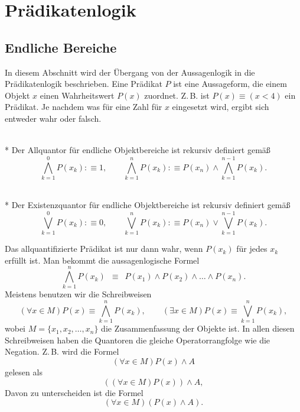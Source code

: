 \newpage
\section{Prädikatenlogik}
\subsection{Endliche Bereiche}
In diesem Abschnitt wird der Übergang von der Aussagenlogik in
die Prädikatenlogik beschrieben. Eine Prädikat $P$ ist eine Aussageform,
die einem Objekt $x$ einen Wahrheitswert $P(x)$ zuordnet. Z.\,B.
ist $P(x)\equiv (x<4)$ ein Prädikat. Je nachdem was für eine Zahl
für $x$ eingesetzt wird, ergibt sich entweder wahr oder falsch.

\begin{Definition}[Allquantor]\mbox{}\\*
Der Allquantor für endliche Objektbereiche
ist rekursiv definiert gemäß%
\[\bigwedge_{k=1}^0 P(x_k) :\equiv 1,\qquad
\bigwedge_{k=1}^n P(x_k) :\equiv P(x_n)\land\bigwedge_{k=1}^{n-1} P(x_k).\]
\end{Definition}

\begin{Definition}[Existenzquantor]\mbox{}\\*
Der Existenzquantor für endliche Objektbereiche
ist rekursiv definiert gemäß%
\[\bigvee_{k=1}^0 P(x_k) :\equiv 0,\qquad
\bigvee_{k=1}^n P(x_k) :\equiv P(x_n)\lor\bigvee_{k=1}^{n-1} P(x_k).\]
\end{Definition}

\noindent
Das allquantifizierte Prädikat ist nur dann wahr, wenn $P(x_k)$ für
jedes $x_k$ erfüllt ist. Man bekommt die aussagenlogische Formel%
\[\bigwedge_{k=1}^n P(x_k)
\enspace\equiv\enspace P(x_1)\land P(x_2)\land\ldots\land P(x_n).\]
Meistens benutzen wir die Schreibweisen
\[(\forall x\in M)P(x) \equiv \bigwedge_{k=1}^n P(x_k),\qquad
(\exists x\in M)P(x) \equiv \bigvee_{k=1}^n P(x_k),\]
wobei $M=\{x_1,x_2,\ldots,x_n\}$ die Zusammenfassung
der Objekte ist. In allen diesen Schreibweisen haben die
Quantoren die gleiche Operatorrangfolge wie die Negation. Z.\,B. wird
die Formel
\[(\forall x\in M)P(x)\land A\]
gelesen als
\[((\forall x\in M)P(x))\land A,\]
Davon zu unterscheiden ist die Formel
\[(\forall x\in M)(P(x)\land A).\]


